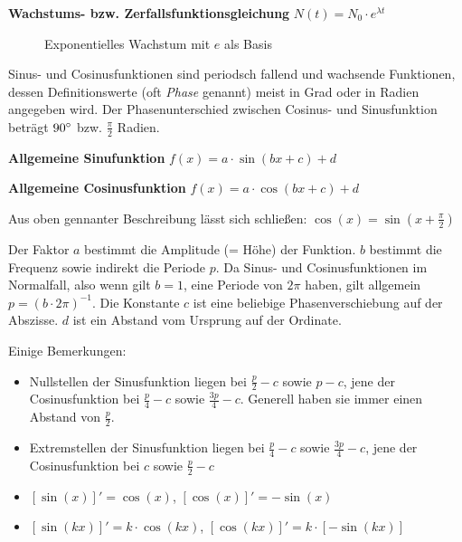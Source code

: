 \textbf{Wachstums- bzw. Zerfallsfunktionsgleichung}  $N(t) = N_{0} \cdot e^{\lambda t}$

\vspace{\parskip}

\begin{figure}[h!]
\centering
\caption*{Exponentielles Wachstum mit $e$ als Basis}
\end{figure}

\pagebreak


Sinus- und Cosinusfunktionen sind periodsch fallend und wachsende Funktionen, dessen Definitionswerte (oft \emph{Phase} genannt) meist in Grad oder in Radien angegeben wird. Der Phasenunterschied zwischen Cosinus- und Sinusfunktion betr\"{a}gt $90\degree$ bzw. $\frac{\pi}{2}$ Radien.

\textbf{Allgemeine Sinufunktion}  $f(x) = a \cdot \sin(bx + c) + d$

\textbf{Allgemeine Cosinusfunktion}  $f(x) = a \cdot \cos(bx + c) + d$

Aus oben gennanter Beschreibung l\"{a}sst sich schlie\ss{}en: $\cos(x) = \sin(x + \frac{\pi}{2})$

Der Faktor $a$ bestimmt die Amplitude (= H\"{o}he) der Funktion. $b$ bestimmt die Frequenz sowie indirekt die Periode $p$. Da Sinus- und Cosinusfunktionen im Normalfall, also wenn gilt $b=1$, eine Periode von $2\pi$ haben, gilt allgemein $p = (b \cdot 2\pi)^{-1}$. Die Konstante $c$ ist eine beliebige Phasenverschiebung auf der Abszisse. $d$ ist ein Abstand vom Ursprung auf der Ordinate.

Einige Bemerkungen:

\begin{itemize}
	\item Nullstellen der Sinusfunktion liegen bei $\frac{p}{2} - c$ sowie $p - c$, jene der Cosinusfunktion bei $\frac{p}{4} - c$ sowie $\frac{3p}{4} - c$. Generell haben sie immer einen Abstand von $\frac{p}{2}$.

	\item Extremstellen der Sinusfunktion liegen bei $\frac{p}{4} - c$ sowie $\frac{3p}{4} - c$, jene der Cosinusfunktion bei $c$ sowie $\frac{p}{2} - c$
	
	\item $[\sin(x)]' = \cos(x)$, $[\cos(x)]' = -\sin(x)$

	\item $[\sin(kx)]' = k \cdot \cos(kx)$, $[\cos(kx)]' = k \cdot [-\sin(kx)]$
\end{itemize}

